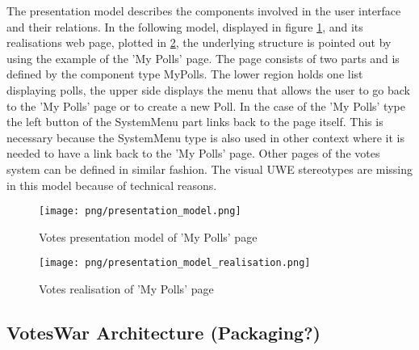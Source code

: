 The presentation model describes the components involved in the user interface and their relations. In the following model, displayed in figure \ref{F:presentation_model}, and its realisations web page, plotted in \ref{F:presentation_model_realisation}, the underlying structure is pointed out by using the example of the 'My Polls' page. The page consists of two parts and is defined by the component type MyPolls. The lower region holds one list displaying polls, the upper side displays the menu that allows the user to go back to the 'My Polls' page or to create a new Poll. In the case of the 'My Polls' type the left button of the SystemMenu part links back to the page itself. This is necessary because the SystemMenu type is also used in other context where it is needed to have a link back to the 'My Polls' page. Other pages of the votes system can be defined in similar fashion. The visual UWE stereotypes are missing in this model because of technical reasons.

 
\begin{figure}
\centering
\texttt{[image: png/presentation\_model.png]}
\caption{Votes presentation model of 'My Polls' page}
\label{F:presentation_model}
\end{figure}

\begin{figure}
\centering
\texttt{[image: png/presentation\_model\_realisation.png]}
\caption{Votes realisation of 'My Polls' page}
\label{F:presentation_model_realisation}
\end{figure}

\subsection{VotesWar Architecture (Packaging?)}

